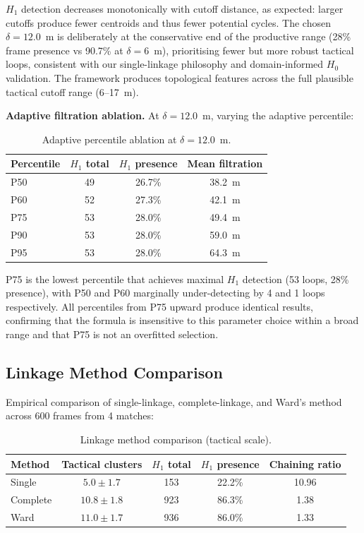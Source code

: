 \(H_1\) detection decreases monotonically with cutoff distance, as expected: larger cutoffs produce fewer centroids and thus fewer potential cycles. The chosen \(\delta=12.0\)~m is deliberately at the conservative end of the productive range (28\% frame presence vs 90.7\% at \(\delta=6\)~m), prioritising fewer but more robust tactical loops, consistent with our single-linkage philosophy and domain-informed \(H_0\) validation. The framework produces topological features across the full plausible tactical cutoff range (6--17~m).

\textbf{Adaptive filtration ablation.} At \(\delta=12.0\)~m, varying the adaptive percentile:

\begin{table}[H]
  \centering
  \caption{Adaptive percentile ablation at \(\delta=12.0\)~m.}
  \label{tab:sensp}
  \begin{tabular}{@{}lccc@{}}
    \toprule
    Percentile & \(H_1\) total & \(H_1\) presence & Mean filtration \\
    \midrule
    P50 & 49 & 26.7\% & 38.2~m \\
    P60 & 52 & 27.3\% & 42.1~m \\
    P75 & 53 & 28.0\% & 49.4~m \\
    P90 & 53 & 28.0\% & 59.0~m \\
    P95 & 53 & 28.0\% & 64.3~m \\
    \bottomrule
  \end{tabular}
\end{table}

P75 is the lowest percentile that achieves maximal \(H_1\) detection (53 loops, 28\% presence), with P50 and P60 marginally under-detecting by 4 and 1 loops respectively. All percentiles from P75 upward produce identical results, confirming that the formula is insensitive to this parameter choice within a broad range and that P75 is not an overfitted selection.

\subsection{Linkage Method Comparison}
\label{sec:linkage}

Empirical comparison of single-linkage, complete-linkage, and Ward's method across 600 frames from 4 matches:

\begin{table}[H]
  \centering
  \caption{Linkage method comparison (tactical scale).}
  \label{tab:linkage}
  \begin{tabular}{@{}lcccc@{}}
    \toprule
    Method & Tactical clusters & \(H_1\) total & \(H_1\) presence & Chaining ratio \\
    \midrule
    Single   & \(5.0\pm1.7\)  & 153 & 22.2\% & 10.96 \\
    Complete & \(10.8\pm1.8\) & 923 & 86.3\% & 1.38 \\
    Ward     & \(11.0\pm1.7\) & 936 & 86.0\% & 1.33 \\
    \bottomrule
  \end{tabular}
\end{table}


